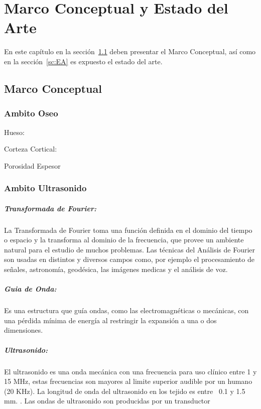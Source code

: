 \chapter{Marco Conceptual y Estado del Arte}

En este capítulo en la sección~\ref{sc:MC} deben presentar el Marco Conceptual,
así como en la sección~\ref{sc:EA} es expuesto el estado del arte.

\section{Marco Conceptual}
\label{sc:MC}

\subsection{Ambito Oseo}

Hueso:

Corteza Cortical:

Porosidad
Espesor

\subsection{Ambito Ultrasonido}

\paragraph{Transformada de Fourier:}
La Transformada de Fourier toma una función definida en el dominio del tiempo o
espacio y la transforma al dominio de la frecuencia, que provee
un ambiente natural para el estudio de muchos problemas.
Las técnicas del Análisis de Fourier son usadas en distintos y diversos campos
como, por ejemplo el procesamiento de señales, astronomía, geodésica,
las imágenes medicas y el análisis de voz.\cite{EMS}

\paragraph{Guia de Onda:}
Es una estructura que guía ondas, como las electromagnéticas o mecánicas,
con una pérdida mínima de energía al restringir la expansión a una o dos dimensiones.

\paragraph{Ultrasonido:}
El ultrasonido es una onda mecánica con una frecuencia
para uso clínico entre 1 y 15 MHz, estas frecuencias son mayores al limite
superior audible por un humano (20 KHz). La longitud de onda del ultrasonido en
los tejido es entre ~0.1 y 1.5 mm.
\cite{IMIP}
\cite{AbuZidan2011ClinicalUP}.
Las ondas de ultrasonido son producidas por un transductor

